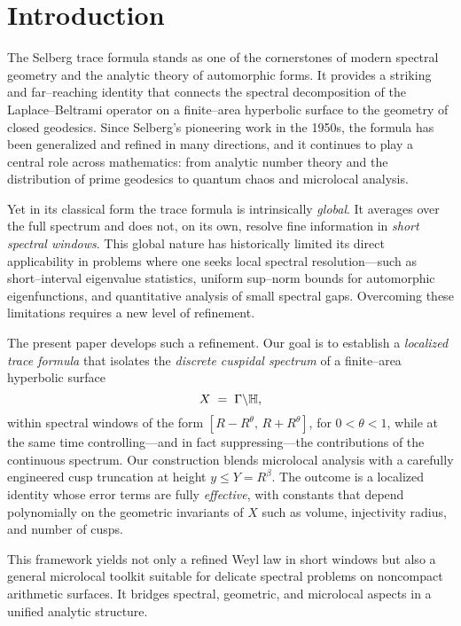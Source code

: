 \section{Introduction}\label{sec:intro}

The Selberg trace formula stands as one of the cornerstones of modern spectral geometry
and the analytic theory of automorphic forms. It provides a striking and far–reaching
identity that connects the spectral decomposition of the Laplace–Beltrami operator on a
finite–area hyperbolic surface to the geometry of closed geodesics. Since Selberg’s
pioneering work in the 1950s, the formula has been generalized and refined in many
directions, and it continues to play a central role across mathematics: from analytic
number theory and the distribution of prime geodesics to quantum chaos and microlocal
analysis. 

Yet in its classical form the trace formula is intrinsically \emph{global}. It averages
over the full spectrum and does not, on its own, resolve fine information in
\emph{short spectral windows}. This global nature has historically limited its direct
applicability in problems where one seeks local spectral resolution—such as short–interval
eigenvalue statistics, uniform sup–norm bounds for automorphic eigenfunctions, and
quantitative analysis of small spectral gaps. Overcoming these limitations requires a
new level of refinement.

The present paper develops such a refinement. Our goal is to establish a
\emph{localized trace formula} that isolates the \emph{discrete cuspidal spectrum} of a
finite–area hyperbolic surface
\[
   X \;=\; \Gamma \backslash \mathbb{H},
\]
within spectral windows of the form $[R-R^{\theta},\,R+R^{\theta}]$, for
$0<\theta<1$, while at the same time controlling—and in fact suppressing—the contributions
of the continuous spectrum. Our construction blends microlocal analysis with a carefully
engineered cusp truncation at height $y \leq Y = R^\beta$. The outcome is a localized
identity whose error terms are fully \emph{effective}, with constants that depend
polynomially on the geometric invariants of $X$ such as volume, injectivity radius, and
number of cusps. 

This framework yields not only a refined Weyl law in short windows but also a general
microlocal toolkit suitable for delicate spectral problems on noncompact arithmetic
surfaces. It bridges spectral, geometric, and microlocal aspects in a unified analytic
structure.

